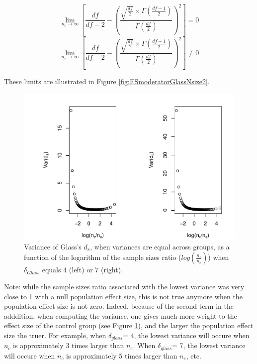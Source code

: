 \documentclass[
  man]{apa6}
\begin{document}
\[\lim_{n_c\rightarrow \infty}\left[\frac{df}{df-2} - \left( \frac{\sqrt{\frac{df}{2}} \times \Gamma \left(\frac{df-1}{2} \right)}{\Gamma \left( \frac{df}{2}\right)}\right)^2 \right]=0\]
\[\lim_{n_e\rightarrow \infty}\left[\frac{df}{df-2} - \left( \frac{\sqrt{\frac{df}{2}} \times \Gamma \left(\frac{df-1}{2} \right)}{\Gamma \left( \frac{df}{2}\right)}\right)^2 \right] \neq 0\]

These limits are illustrated in Figure \ref{fig:ESmoderatorGlassNsize2}.

\begin{figure}
\centering
\includegraphics{Theoretical-Variance-of-all-estimators-as-a-function-of-population-parameters_files/figure-latex/varglasshomNratiobis2-1.pdf}
\caption{\label{fig:varglasshomNratiobis2}Variance of Glass's \(d_s\), when variances are equal across groups, as a function of the logarithm of the sample sizes ratio (\(log\left(\frac{n_c}{n_e} \right)\)) when \(\delta_{Glass}\) equals 4 (left) or 7 (right).}
\end{figure}

Note: while the sample sizes ratio associated with the lowest variance was very close to 1 with a null population effect size, this is not true anymore when the population effect size is not zero. Indeed, because of the second term in the adddition, when computing the variance, one gives much more weight to the effect size of the control group (see Figure \ref{fig:varglasshomNratiobis2}), and the larger the population effect size the truer. For example, when \(\delta_{glass}\)= 4, the lowest variance will occure when \(n_c\) is approximately 3 times larger than \(n_e\). When \(\delta_{glass}\)= 7, the lowest variance will occure when \(n_c\) is approximately 5 times larger than \(n_e\), etc.
\end{document}
